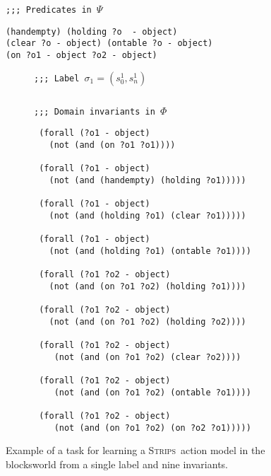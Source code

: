 \documentclass{article}
\newcommand{\strips}{\textsc{Strips}}     %
\begin{document}
\begin{figure}
{\footnotesize\tt ;;; Predicates in $\Psi$}
\begin{scriptsize}
\begin{verbatim}
(handempty) (holding ?o  - object)
(clear ?o - object) (ontable ?o - object)
(on ?o1 - object ?o2 - object)
\end{verbatim}
\end{scriptsize}
\vspace{0.2cm}
\begin{subfigure}{.6\textwidth}
{\footnotesize\tt ;;; Label $\sigma_1=(s_0^1,s_{n}^1)$}
\begin{lstlisting}[mathescape]
\end{lstlisting}
\vspace{-0.2cm}
\end{subfigure}%
\vspace{0.6cm}
\begin{subfigure}{.6\textwidth}
{\footnotesize\tt ;;; Domain invariants in $\Phi$}
\begin{scriptsize}
\begin{verbatim}
 (forall (?o1 - object)
   (not (and (on ?o1 ?o1))))

 (forall (?o1 - object)
   (not (and (handempty) (holding ?o1)))))

 (forall (?o1 - object)
   (not (and (holding ?o1) (clear ?o1)))))

 (forall (?o1 - object)
   (not (and (holding ?o1) (ontable ?o1))))

 (forall (?o1 ?o2 - object)
   (not (and (on ?o1 ?o2) (holding ?o1))))

 (forall (?o1 ?o2 - object)
   (not (and (on ?o1 ?o2) (holding ?o2))))

 (forall (?o1 ?o2 - object)
    (not (and (on ?o1 ?o2) (clear ?o2))))

 (forall (?o1 ?o2 - object)
    (not (and (on ?o1 ?o2) (ontable ?o1))))

 (forall (?o1 ?o2 - object)
    (not (and (on ?o1 ?o2) (on ?o2 ?o1)))))
\end{verbatim}
\end{scriptsize}
\end{subfigure}%
 \caption{\small Example of a task for learning a \strips\ action model in the blocksworld from a single label and nine invariants.}
\label{fig:lexample}
\end{figure}
\end{document}
